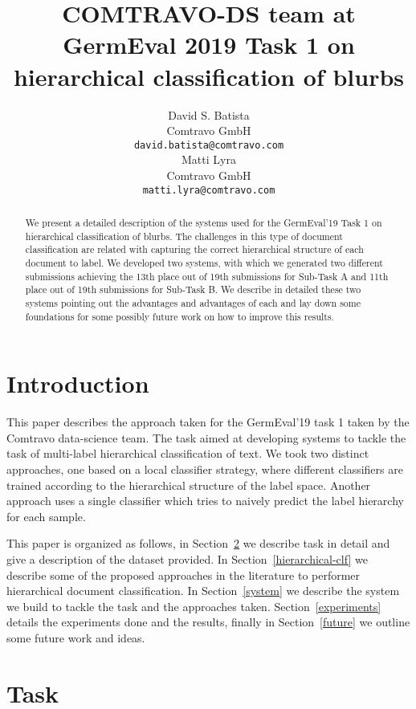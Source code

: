 \documentclass[11pt,a4paper]{article}
\title{COMTRAVO-DS team at GermEval 2019 Task 1 on hierarchical classification of blurbs}
\author{David S. Batista \\
  Comtravo GmbH \\
  {\tt david.batista@comtravo.com} \\\And
  Matti Lyra \\
  Comtravo GmbH \\
  {\tt matti.lyra@comtravo.com} \\}
\date{}
\begin{document}
\maketitle

\begin{abstract}
We present a detailed description of the systems used for the GermEval'19 Task 1
on hierarchical classification of blurbs. The challenges in this type of document
classification are related with capturing the correct hierarchical structure of
each document to label.
We developed two systems, with which we generated two different submissions
achieving the 13th place out of 19th submissions for Sub-Task A and 11th place
out of 19th submissions for Sub-Task B. We describe in detailed these two systems
pointing out the advantages and advantages of each and lay down some foundations
for some possibly future work on how to improve this results.
\end{abstract}




\section{Introduction}

This paper describes the approach taken for the GermEval'19 task 1 taken by the
Comtravo data-science team. The task aimed at developing systems to tackle the
task of multi-label hierarchical classification of text. We took two distinct
approaches, one based on a local classifier strategy, where different classifiers
are trained according to the hierarchical structure of the label space. Another
approach uses a single classifier which tries to naively predict the label
hierarchy for each sample.

This paper is organized as follows, in Section~\ref{task} we describe task in
detail and give a description of the dataset provided. In Section~\ref{hierarchical-clf}
we describe some of the proposed approaches in the literature to performer
hierarchical document classification. In Section~\ref{system} we describe the
system we build to tackle the task and the approaches taken. Section~\ref{experiments}
details the experiments done and the results, finally in Section~\ref{future} we
outline some future work and ideas.



\section{Task}\label{task}
\end{document}

